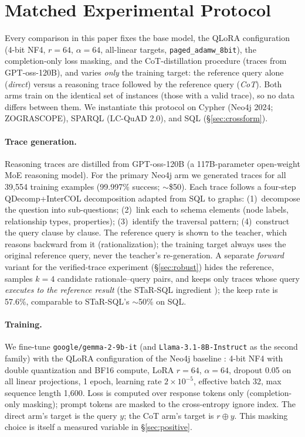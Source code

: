 \documentclass[11pt]{article}
\begin{document}
\section{Matched Experimental Protocol}
\label{sec:protocol}
Every comparison in this paper fixes the base model, the QLoRA configuration (4-bit NF4, $r{=}64$,
$\alpha{=}64$, all-linear targets, \texttt{paged\_adamw\_8bit}), the completion-only loss masking,
and the CoT-distillation procedure (traces from GPT-oss-120B), and varies \emph{only} the training
target: the reference query alone (\emph{direct}) versus a reasoning trace followed by the reference
query (\emph{CoT}). Both arms train on the identical set of instances (those with a valid trace), so
no data differs between them. We instantiate this protocol on Cypher (Neo4j 2024; ZOGRASCOPE),
SPARQL (LC-QuAD 2.0), and SQL (\S\ref{sec:crossform}).

\paragraph{Trace generation.} Reasoning traces are distilled from GPT-oss-120B (a 117B-parameter
open-weight MoE reasoning model). For the primary Neo4j arm we generated traces for all 39{,}554
training examples (99.997\% success; $\sim$\$50). Each trace follows a four-step QDecomp+InterCOL
decomposition adapted from SQL \citep{tai2023cot} to graphs: (1)~decompose the question into
sub-questions; (2)~link each to schema elements (node labels, relationship types, properties);
(3)~identify the traversal pattern; (4)~construct the query clause by clause. The reference query is
shown to the teacher, which reasons backward from it (rationalization); the training target always
uses the original reference query, never the teacher's re-generation. A separate \emph{forward}
variant for the verified-trace experiment (\S\ref{sec:robust}) hides the reference, samples $k{=}4$
candidate rationale--query pairs, and keeps only traces whose query \emph{executes to the reference
result} (the STaR-SQL ingredient \citealt{he2025starsql}); the keep rate is 57.6\%, comparable to
STaR-SQL's $\sim$50\% on SQL.

\paragraph{Training.} We fine-tune \texttt{google/gemma-2-9b-it} (and \texttt{Llama-3.1-8B-Instruct}
as the second family) with the QLoRA configuration of the Neo4j baseline
\citep{ozsoy2025text2cypher, dettmers2023qlora, hu2021lora}: 4-bit NF4 with double quantization and
BF16 compute, LoRA $r{=}64$, $\alpha{=}64$, dropout 0.05 on all linear projections, 1 epoch,
learning rate $2{\times}10^{-5}$, effective batch 32, max sequence length 1{,}600. Loss is computed
over response tokens only (completion-only masking); prompt tokens are masked to the cross-entropy
ignore index. The direct arm's target is the query $y$; the CoT arm's target is $r \oplus y$. This
masking choice is itself a measured variable in \S\ref{sec:positive}.
\end{document}
